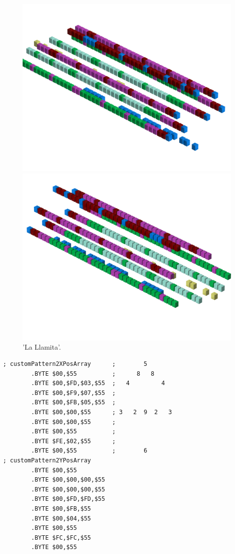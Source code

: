 \begin{figure}[H]
    \centering
    \begin{adjustbox}{width=12cm,center}
      \includegraphics[width=12cm]{src/patterns/pattern10-45.png}%
    \end{adjustbox}
    \begin{adjustbox}{width=12cm,margin=0cm -4cm}
      \includegraphics[width=12cm]{src/patterns/pattern10-225.png}%
    \end{adjustbox}
\caption{'La Llamita'.}
\end{figure}
\clearpage

\begin{lstlisting}
; customPattern2XPosArray      ;        5       
        .BYTE $00,$55          ;      8   8     
        .BYTE $00,$FD,$03,$55  ;   4         4  
        .BYTE $00,$F9,$07,$55  ;                
        .BYTE $00,$FB,$05,$55  ;                
        .BYTE $00,$00,$55      ; 3   2  9  2   3
        .BYTE $00,$00,$55      ;                
        .BYTE $00,$55          ;                
        .BYTE $FE,$02,$55      ;                
        .BYTE $00,$55          ;        6       
; customPattern2YPosArray
        .BYTE $00,$55
        .BYTE $00,$00,$00,$55
        .BYTE $00,$00,$00,$55
        .BYTE $00,$FD,$FD,$55
        .BYTE $00,$FB,$55
        .BYTE $00,$04,$55
        .BYTE $00,$55
        .BYTE $FC,$FC,$55
        .BYTE $00,$55
\end{lstlisting}


